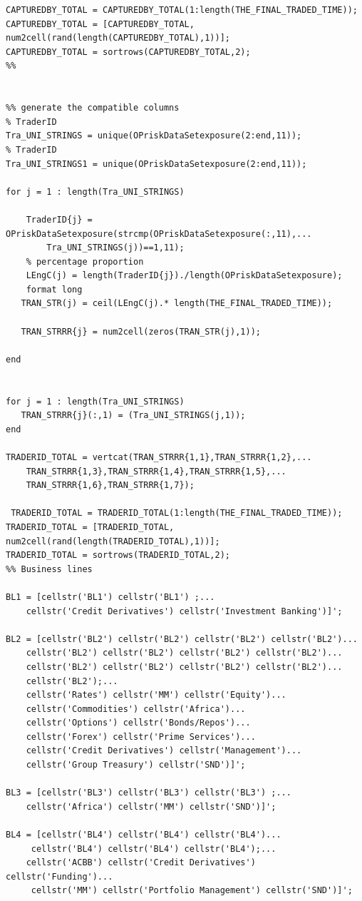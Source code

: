\documentclass{DissertateUSU}
\begin{document}
\begin{verbatim}
CAPTUREDBY_TOTAL = CAPTUREDBY_TOTAL(1:length(THE_FINAL_TRADED_TIME));
CAPTUREDBY_TOTAL = [CAPTUREDBY_TOTAL, num2cell(rand(length(CAPTUREDBY_TOTAL),1))];
CAPTUREDBY_TOTAL = sortrows(CAPTUREDBY_TOTAL,2);
%%


%% generate the compatible columns
% TraderID
Tra_UNI_STRINGS = unique(OPriskDataSetexposure(2:end,11));
% TraderID
Tra_UNI_STRINGS1 = unique(OPriskDataSetexposure(2:end,11));

for j = 1 : length(Tra_UNI_STRINGS)
    
    TraderID{j} = OPriskDataSetexposure(strcmp(OPriskDataSetexposure(:,11),...
        Tra_UNI_STRINGS(j))==1,11);
    % percentage proportion
    LEngC(j) = length(TraderID{j})./length(OPriskDataSetexposure);
    format long
   TRAN_STR(j) = ceil(LEngC(j).* length(THE_FINAL_TRADED_TIME));
   
   TRAN_STRRR{j} = num2cell(zeros(TRAN_STR(j),1));
   
end


for j = 1 : length(Tra_UNI_STRINGS)
   TRAN_STRRR{j}(:,1) = (Tra_UNI_STRINGS(j,1));
end

TRADERID_TOTAL = vertcat(TRAN_STRRR{1,1},TRAN_STRRR{1,2},...
    TRAN_STRRR{1,3},TRAN_STRRR{1,4},TRAN_STRRR{1,5},...
    TRAN_STRRR{1,6},TRAN_STRRR{1,7});

 TRADERID_TOTAL = TRADERID_TOTAL(1:length(THE_FINAL_TRADED_TIME));
TRADERID_TOTAL = [TRADERID_TOTAL, num2cell(rand(length(TRADERID_TOTAL),1))];
TRADERID_TOTAL = sortrows(TRADERID_TOTAL,2);
%% Business lines

BL1 = [cellstr('BL1') cellstr('BL1') ;...
    cellstr('Credit Derivatives') cellstr('Investment Banking')]';

BL2 = [cellstr('BL2') cellstr('BL2') cellstr('BL2') cellstr('BL2')...
    cellstr('BL2') cellstr('BL2') cellstr('BL2') cellstr('BL2')...
    cellstr('BL2') cellstr('BL2') cellstr('BL2') cellstr('BL2')...
    cellstr('BL2');...
    cellstr('Rates') cellstr('MM') cellstr('Equity')...
    cellstr('Commodities') cellstr('Africa')...
    cellstr('Options') cellstr('Bonds/Repos')...
    cellstr('Forex') cellstr('Prime Services')...
    cellstr('Credit Derivatives') cellstr('Management')...
    cellstr('Group Treasury') cellstr('SND')]';

BL3 = [cellstr('BL3') cellstr('BL3') cellstr('BL3') ;...
    cellstr('Africa') cellstr('MM') cellstr('SND')]';

BL4 = [cellstr('BL4') cellstr('BL4') cellstr('BL4')...
     cellstr('BL4') cellstr('BL4') cellstr('BL4');...
    cellstr('ACBB') cellstr('Credit Derivatives') cellstr('Funding')...
     cellstr('MM') cellstr('Portfolio Management') cellstr('SND')]';
 

\end{verbatim}
\end{document}
